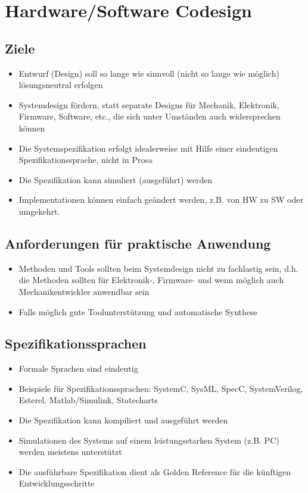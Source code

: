 \section{Hardware/Software Codesign}
\subsection{Ziele}
	\begin{itemize}
		\item Entwurf (Design) soll so lange wie sinnvoll (nicht so lange wie möglich) lösungsneutral erfolgen
		\item Systemdesign fördern, statt separate Designs für Mechanik, Elektronik, Firmware, Software, etc., die sich unter Umständen auch widersprechen können
		\item Die Systemspezifikation erfolgt idealerweise mit Hilfe einer eindeutigen Spezifikationssprache, nicht in Prosa
		\item Die Spezifikation kann simuliert (ausgeführt) werden
		\item Implementationen können einfach geändert werden, z.B. von HW zu SW oder umgekehrt.
	\end{itemize}

\subsection{Anforderungen für praktische Anwendung}
	\begin{itemize}
		\item Methoden und Tools sollten beim Systemdesign nicht zu fachlastig sein, d.h. die Methoden sollten für Elektronik-, Firmware- und wenn möglich auch Mechanikentwickler anwendbar sein
		\item Falls möglich gute Toolunterstützung und automatische Synthese
	\end{itemize}

\subsection{Spezifikationssprachen}
	\begin{itemize}
		\item Formale Sprachen sind eindeutig
		\item Beispiele für Spezifikationssprachen: SystemC, SysML, SpecC, SystemVerilog, Esterel, Matlab/Simulink, Statecharts
		\item Die Spezifikation kann kompiliert und ausgeführt werden
		\item Simulationen des Systems auf einem leistungsstarken System (z.B. PC) werden meistens unterstützt
		\item Die ausführbare Spezifikation dient als Golden Reference für die künftigen Entwicklungsschritte
	\end{itemize}


